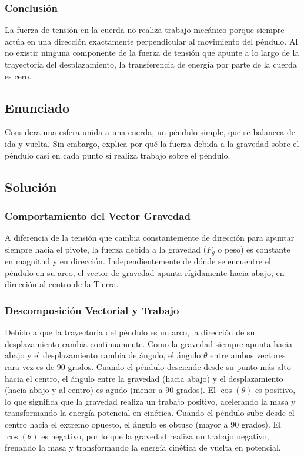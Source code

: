 \documentclass[a4paper,12pt]{article}
\begin{document}
\subsubsection*{Conclusión}
La fuerza de tensión en la cuerda no realiza trabajo mecánico porque siempre actúa en una dirección exactamente perpendicular al movimiento del péndulo. Al no existir ninguna componente de la fuerza de tensión que apunte a lo largo de la trayectoria del desplazamiento, la transferencia de energía por parte de la cuerda es cero.

\newpage
\subsection*{Enunciado}
Considera una esfera unida a una cuerda, un péndulo simple, que se balancea de ida y vuelta.
 Sin embargo, explica por qué la fuerza debida a la gravedad sobre el péndulo casi en cada punto sí realiza trabajo sobre el péndulo.

\subsection*{Solución}

\subsubsection*{Comportamiento del Vector Gravedad}
A diferencia de la tensión que cambia constantemente de dirección para apuntar siempre hacia el pivote, la fuerza debida a la gravedad ($F_g$ o peso) es constante en magnitud y en dirección. Independientemente de dónde se encuentre el péndulo en su arco, el vector de gravedad apunta rígidamente hacia abajo, en dirección al centro de la Tierra.

\subsubsection*{Descomposición Vectorial y Trabajo}
Debido a que la trayectoria del péndulo es un arco, la dirección de su desplazamiento cambia continuamente. Como la gravedad siempre apunta hacia abajo y el desplazamiento cambia de ángulo, el ángulo $\theta$ entre ambos vectores rara vez es de 90 grados. 
Cuando el péndulo desciende desde su punto más alto hacia el centro, el ángulo entre la gravedad (hacia abajo) y el desplazamiento (hacia abajo y al centro) es agudo (menor a 90 grados). El $\cos(\theta)$ es positivo, lo que significa que la gravedad realiza un trabajo positivo, acelerando la masa y transformando la energía potencial en cinética.
Cuando el péndulo sube desde el centro hacia el extremo opuesto, el ángulo es obtuso (mayor a 90 grados). El $\cos(\theta)$ es negativo, por lo que la gravedad realiza un trabajo negativo, frenando la masa y transformando la energía cinética de vuelta en potencial.
\end{document}
